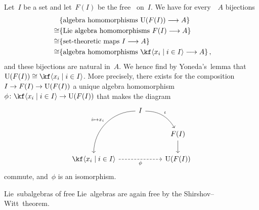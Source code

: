 \begin{example}
  \label{uea of free lie algebra}
  Let~$I$ be a set and let~$F(I)$ be the free~{\liealgebra{$\kf$}} on~$I$.
  We have for every~{\algebra{$\kf$}}~$A$ bijections
  \begin{align*}
    {}&
    \{ \text{algebra homomorphisms~$\Univ(F(I)) \to A$} \}
    \\
    \cong&
    \{ \text{Lie~algebra homomorphisms~$F(I) \to A$} \}
    \\
    \cong&
    \{ \text{set-theoretic maps~$I \to A$} \}
    \\\
    \cong&
    \{ \text{algebra homomorphisms~$\kf\gen{x_i \suchthat i \in I} \to A$} \} \,,
  \end{align*}
  and these bijections are natural in~$A$.
  We hence find by Yoneda’s~lemma that~$\Univ(F(I)) \cong \kf\gen{x_i \suchthat i \in I}$.
  More precisely, there exists for the composition~$I \to F(I) \to \Univ(F(I))$ a unique algebra homomorphism~$\phi \colon \kf\gen{x_i \suchthat i \in I} \to \Univ(F(I))$ that makes the diagram
  \[
    \begin{tikzcd}
        {}
      & I
        \arrow[bend right, out = -45, in=225]{ddl}[above left]{i \mapsto x_i}
        \arrow[bend left]{dr}[above right]{\iota}
      & {}
      \\
        {}
      & {}
      & F(I)
        \arrow{d}
      \\
        \kf\gen{x_i \suchthat i \in I}
        \arrow[dashed]{rr}[below]{\phi}
      & {}
      & \Univ(F(I))
    \end{tikzcd}
  \]
  commute, and~$\phi$ is an isomorphism.
\end{example}


\begin{remark}
  Lie~subalgebras of free Lie~algebras are again free by the Shirshov--Witt~theorem.
\end{remark}





